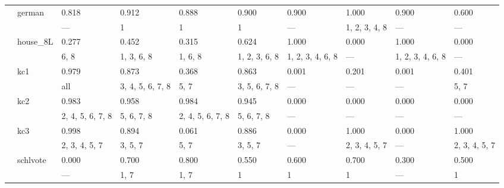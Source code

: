 \documentclass{article}
\begin{document}
\begin{center}
\begin{longtable}{p{1.2cm}p{1.8cm}p{1cm}p{1cm}p{1cm}p{1cm}p{1cm}p{1cm}p{1cm}p{1cm}}
             & german       & 0.818            & 0.912            & 0.888            & 0.900            & 0.900            & 1.000            & 0.900            & 0.600            \\
             &              & ---              & 1                & 1                & 1                & ---              & 1, 2, 3, 4, 8    & ---              & ---              \\
             & house\_8L     & 0.277            & 0.452            & 0.315            & 0.624            & 1.000            & 0.000            & 1.000            & 0.000            \\
             &              & 6, 8             & 1, 3, 6, 8       & 1, 6, 8          & 1, 2, 3, 6, 8    & 1, 2, 3, 4, 6, 8 & ---              & 1, 2, 3, 4, 6, 8 & ---              \\
             & kc1          & 0.979            & 0.873            & 0.368            & 0.863            & 0.001            & 0.201            & 0.001            & 0.401            \\
             &              & all              & 3, 4, 5, 6, 7, 8 & 5, 7             & 3, 5, 6, 7, 8    & ---              & ---              & ---              & 5, 7             \\
             & kc2          & 0.983            & 0.958            & 0.984            & 0.945            & 0.000            & 0.000            & 0.000            & 0.000            \\
             &              & 2, 4, 5, 6, 7, 8 & 5, 6, 7, 8       & 2, 4, 5, 6, 7, 8 & 5, 6, 7, 8       & ---              & ---              & ---              & ---              \\
             & kc3          & 0.998            & 0.894            & 0.061            & 0.886            & 0.000            & 1.000            & 0.000            & 1.000            \\
             &              & 2, 3, 4, 5, 7    & 3, 5, 7          & 5, 7             & 3, 5, 7          & ---              & 2, 3, 4, 5, 7    & ---              & 2, 3, 4, 5, 7    \\
             & schlvote     & 0.000            & 0.700            & 0.800            & 0.550            & 0.600            & 0.700            & 0.300            & 0.500            \\
             &              & ---              & 1, 7             & 1, 7             & 1                & 1                & 1                & ---              & 1                \\

\end{longtable}
\end{center}
\end{document}
